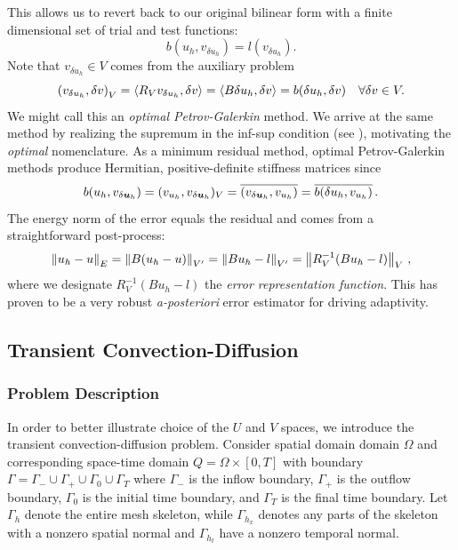 \documentclass{article}
\begin{document}
This allows us to revert back to our original bilinear form with a finite dimensional set of trial and test functions:
\begin{equation*}
b(u_h,v_{\delta u_h})=l(v_{\delta u_h}).
\end{equation*}
Note that $v_{\delta u_h}\in V$ comes from the auxiliary problem
\begin{equation*}
\left( v_{\delta u_h},\delta v \right)_V=\left\langle R_Vv_{\delta u_h},\delta v \right\rangle
=\left\langle B\delta u_h,\delta v \right\rangle=b(\delta u_h,\delta v)\quad\forall\delta v\in V.
\end{equation*}
We might call this an \emph{optimal Petrov-Galerkin} method.
We arrive at the same method by realizing the supremum in the inf-sup condition (see \cite{DPGOverview}), motivating the \emph{optimal} nomenclature.
As a minimum residual method, optimal Petrov-Galerkin methods produce Hermitian, positive-definite stiffness matrices since
\[
b(u_h,v_{\delta\boldsymbol{u}_h})=(v_{u_h},v_{\delta\boldsymbol{u}_h})_V=\overline{(v_{\delta\boldsymbol{u}_h},v_{u_h})}=\overline{b(\delta u_h,v_{u_h})}\,.
\]
The energy norm of the error equals the residual and comes from a straightforward post-process:
\[
\left\| u_h-u \right\|_E=\left\| B(u_h-u) \right\|_{V'}=\left\| Bu_h-l \right\|_{V'}=\left\| R_V^{-1}(Bu_h-l) \right\|_V\,,
\]
where we designate $R_V^{-1}(Bu_h-l)$ the \emph{error representation function}.
This has proven to be a very robust \emph{a-posteriori} error estimator for driving adaptivity.

\subsection{Transient Convection-Diffusion}
\subsubsection{Problem Description}
In order to better illustrate choice of the $U$ and $V$ spaces, we introduce the transient convection-diffusion problem.
Consider spatial domain domain $\Omega$ and corresponding space-time domain $Q=\Omega\times[0,T]$ 
with boundary $\Gamma=\Gamma_-\cup\Gamma_+\cup\Gamma_0\cup\Gamma_T$ 
where $\Gamma_-$ is the inflow boundary, $\Gamma_+$ is the outflow boundary, $\Gamma_0$ is the initial time boundary, 
and $\Gamma_T$ is the final time boundary. Let $\Gamma_h$ denote the entire mesh skeleton, 
while $\Gamma_{h_x}$ denotes any parts of the skeleton with a nonzero spatial normal and $\Gamma_{h_t}$ have a nonzero temporal normal.
\end{document}
